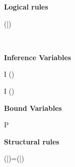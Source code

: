 \begin{figure*}[htbp]
\centering\leavevmode
{}
\vspace*{1em}

\begin{minipage}[t]{.4\textwidth}
\centering  
\textbf{Logical rules}
\vspace*{-1em}

\infax
  { \jexc{\Bottom}{\alpha}{\TRUE} }

\infrule
  { \jsub{\alpha}{\Bottom}{\C} }
  { \jexc{\Any}{\alpha}{\C} }

\infrule
  { \countof(\bar{\alpha})  }
  {  }

\infax
  {  }

\infrule
  { \jexc{\alpha}{\chi}{\C} \andalso 
    \\
    }
  {  }

\infrule
  { \jexc{\alpha}{\chi}{\C}  \andalso  {} }
  {  }

\vspace*{2ex}
\textbf{Inference Variables}
\vspace*{-1em}

\infrule
  { I \not\in {}(\Delta) }
  {  }
  
\infrule
  { I \not\in {}(\Delta) }
  {  }

\vspace*{2ex}
\textbf{Bound Variables}
\vspace*{-1em}

\infrule
  { \bd{\dontcare} \extends P \extends \bdb{\xi} \in \Delta \\
    \jbexc{\xi}{\alpha}{\C} }
  {  }

\vspace*{2ex}
\textbf{Structural rules}
\vspace*{-1em}

\infrule
  { \countof(\bar{\alpha})=\countof(\bar{\eta})  \andalso {} }
  { \jexc{(\bar{\alpha})}{(\bar{\eta})}{\bigvee\set{\C}} }


\end{minipage}
\end{figure*}
